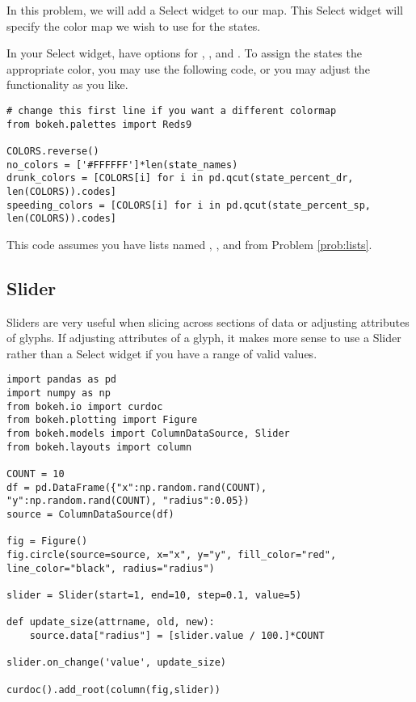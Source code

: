 \begin{problem}
In this problem, we will add a Select widget to our map. This Select widget will
specify the color map we wish to use for the states.

In your Select widget, have options for , , and
. To assign the states the appropriate color, you may use
the following code, or you may adjust the functionality as you like.

\begin{lstlisting}
# change this first line if you want a different colormap
from bokeh.palettes import Reds9

COLORS.reverse()
no_colors = ['#FFFFFF']*len(state_names)
drunk_colors = [COLORS[i] for i in pd.qcut(state_percent_dr, len(COLORS)).codes]
speeding_colors = [COLORS[i] for i in pd.qcut(state_percent_sp, len(COLORS)).codes]
\end{lstlisting}

This code assumes you have lists named , ,
and  from Problem \ref{prob:lists}.

\end{problem}

\subsection*{Slider}
Sliders are very useful when slicing across sections of data or adjusting
attributes of glyphs. If adjusting attributes of a glyph, it makes more sense to
use a Slider rather than a Select widget if you have a range of valid values.

\begin{lstlisting}
import pandas as pd
import numpy as np
from bokeh.io import curdoc
from bokeh.plotting import Figure
from bokeh.models import ColumnDataSource, Slider
from bokeh.layouts import column

COUNT = 10
df = pd.DataFrame({"x":np.random.rand(COUNT), "y":np.random.rand(COUNT), "radius":0.05})
source = ColumnDataSource(df)

fig = Figure()
fig.circle(source=source, x="x", y="y", fill_color="red", line_color="black", radius="radius")

slider = Slider(start=1, end=10, step=0.1, value=5)

def update_size(attrname, old, new):
    source.data["radius"] = [slider.value / 100.]*COUNT

slider.on_change('value', update_size)

curdoc().add_root(column(fig,slider))
\end{lstlisting}

